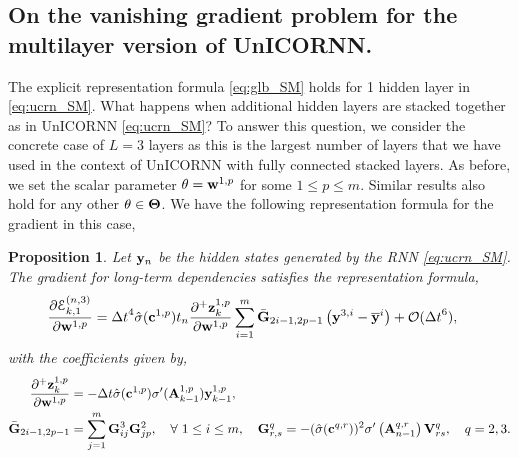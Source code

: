 \documentclass{article}
\newtheorem{proposition}[theorem]{Proposition}
\newcommand{\by}{{\bf y}}
\newcommand{\bz}{{\bf z}}
\newcommand{\bw}{{\bf w}}
\newcommand{\bV}{{\bf V}}
\newcommand{\bA}{{\bf A}}
\newcommand{\bc}{{\bf c}}
\newcommand{\ord}{{\mathcal O}}
\newcommand{\Dt}{{\Delta t}}
\newcommand{\E}{\EuScript{E}}
\begin{document}
 \subsection{On the vanishing gradient problem for the multilayer version of UnICORNN.}
 The explicit representation formula \eqref{eq:glb_SM} holds for 1 hidden layer in \eqref{eq:ucrn_SM}. What happens when additional hidden layers are stacked together as in UnICORNN \eqref{eq:ucrn_SM}? To answer this question, we consider the concrete case of $L=3$ layers as this is the largest number of layers that we have used in the context of UnICORNN with fully connected stacked layers. As before, we set the scalar parameter $\theta = \bw^{1,p}$ for some $1 \leq p \leq m$. Similar results also hold for any other $\theta \in {\bf \Theta}$. We have the following representation formula for the gradient in this case,
 \begin{proposition}
\label{prop:5}
Let $\by_n$ be the hidden states generated by the RNN \eqref{eq:ucrn_SM}. The gradient for long-term dependencies satisfies the representation formula,
\begin{equation}
     \label{eq:glb1}
     \begin{aligned}
      \frac{\partial \E^{(n,3)}_{k,1}}{\partial \bw^{1,p}} &=
      \Dt^4\hat{\sigma}(\bc^{1,p})t_n\frac{\partial^+\bz^{1,p}_k}{\partial \bw^{1,p}}\sum\limits_{i=1}^m \bar{\bf G}_{2i-1,2p-1}\left(\by^{3,i}-\overline{\by}^i\right) + \ord(\Dt^6),
     \end{aligned}
 \end{equation}
 with the coefficients given by,
 \begin{equation}
     \label{eq:glbcoeff_SM}
     \begin{aligned}
    \frac{\partial^+\bz^{1,p}_k}{\partial \bw^{1,p}} &= -\Dt\hat{\sigma}(\bc^{1,p})\sigma^{\prime}(\bA^{1,p}_{k-1})\by^{1,p}_{k-1}, \\
     \bar{\bf G}_{2i-1,2p-1} &= \sum\limits_{j=1}^m {\bf G}^3_{ij} {\bf G}^2_{jp}, \quad \forall~1 \leq i \leq m, \quad {\bf G}^{q}_{r,s} = - (\hat{\sigma}(\bc^{q,r}))^2 \sigma^{\prime}\left(\bA^{q,r}_{n-1}\right)\bV^q_{rs}, \quad q=2,3. 
     \end{aligned}
 \end{equation}
\end{proposition}
\end{document}
